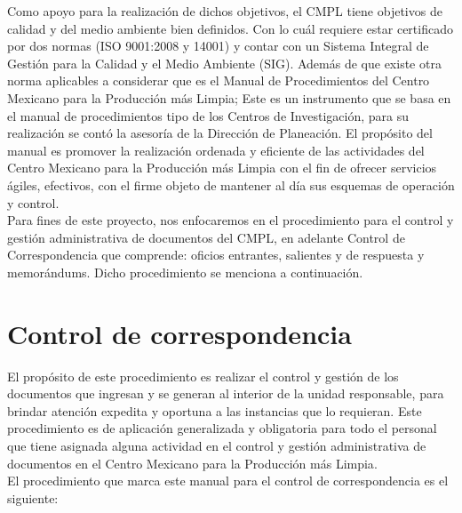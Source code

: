 	Como apoyo para la realización de dichos objetivos, el CMPL tiene objetivos de calidad y del medio ambiente bien definidos. Con lo cuál requiere estar certificado por dos normas (ISO 9001:2008 y 14001) y contar con un Sistema Integral de Gestión para la Calidad y el Medio Ambiente (SIG). Además de que existe otra norma aplicables a considerar que es el Manual de Procedimientos del Centro Mexicano para la Producción más Limpia; Este es un instrumento que se basa en el manual de procedimientos tipo de los Centros de Investigación, para su realización se contó la asesoría de la Dirección de Planeación. El propósito del manual es promover la realización ordenada y eficiente de las actividades del Centro Mexicano para la Producción más Limpia con el fin de ofrecer servicios ágiles, efectivos, con el firme objeto de mantener al día sus esquemas de operación y control\cite{ManProcCMPL}.\\

Para fines de este proyecto, nos enfocaremos en el procedimiento para el control y gestión administrativa de documentos del CMPL, en adelante Control de Correspondencia que comprende: oficios entrantes, salientes y de respuesta y memorándums. Dicho procedimiento se menciona a continuación. \\
	
\section{Control de correspondencia}

El propósito de este procedimiento es realizar el control y gestión de los documentos que ingresan y se generan al interior de la unidad responsable, para brindar atención expedita y oportuna a las instancias que lo requieran. Este procedimiento es de aplicación generalizada y obligatoria para todo el personal que tiene asignada alguna actividad en el control y gestión administrativa de documentos en el Centro Mexicano para la Producción más Limpia\cite{ManProcCMPL}.\\
El procedimiento que marca este manual para el control de correspondencia es el siguiente: \\

